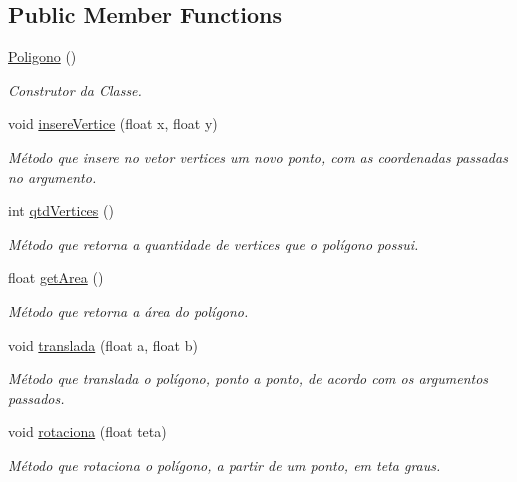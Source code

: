\subsection*{Public Member Functions}
\begin{DoxyCompactItemize}
\item 
\mbox{\label{classPoligono_a9311a9a1496878c09c8508b3636e2870}} 
\mbox{\hyperlink{classPoligono_a9311a9a1496878c09c8508b3636e2870}{Poligono}} ()
\begin{DoxyCompactList}\small\item\em Construtor da Classe. \end{DoxyCompactList}\item 
void \mbox{\hyperlink{classPoligono_aeaad76667207d96ea0d69c2dfb3bc2a9}{insere\+Vertice}} (float x, float y)
\begin{DoxyCompactList}\small\item\em Método que insere no vetor \textquotesingle{}vertices\textquotesingle{} um novo ponto, com as coordenadas passadas no argumento. \end{DoxyCompactList}\item 
int \mbox{\hyperlink{classPoligono_ae2c1c915b4a72104724d1302138e7caa}{qtd\+Vertices}} ()
\begin{DoxyCompactList}\small\item\em Método que retorna a quantidade de vertices que o polígono possui. \end{DoxyCompactList}\item 
float \mbox{\hyperlink{classPoligono_ab1a85a090e7442bf3151602b05da9e19}{get\+Area}} ()
\begin{DoxyCompactList}\small\item\em Método que retorna a área do polígono. \end{DoxyCompactList}\item 
void \mbox{\hyperlink{classPoligono_adbf605dfd0419b7301c9be0ec1dbe41b}{translada}} (float a, float b)
\begin{DoxyCompactList}\small\item\em Método que translada o polígono, ponto a ponto, de acordo com os argumentos passados. \end{DoxyCompactList}\item 
void \mbox{\hyperlink{classPoligono_a937c0e2bec60140fcc7b7bde5d64d339}{rotaciona}} (float teta)
\begin{DoxyCompactList}\small\item\em Método que rotaciona o polígono, a partir de um ponto, em teta graus. \end{DoxyCompactList}\item 

\end{DoxyCompactItemize}

